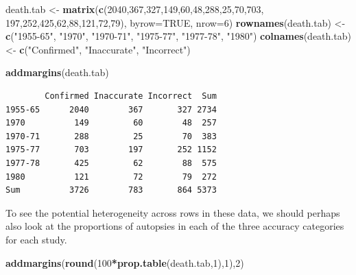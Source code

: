 \documentclass[
]{book}
\newenvironment{Shaded}{\begin{snugshade}}{\end{snugshade}}
\newcommand{\DataTypeTok}[1]{\textcolor[rgb]{0.13,0.29,0.53}{#1}}
\newcommand{\DecValTok}[1]{\textcolor[rgb]{0.00,0.00,0.81}{#1}}
\newcommand{\KeywordTok}[1]{\textcolor[rgb]{0.13,0.29,0.53}{\textbf{#1}}}
\newcommand{\NormalTok}[1]{#1}
\newcommand{\OperatorTok}[1]{\textcolor[rgb]{0.81,0.36,0.00}{\textbf{#1}}}
\newcommand{\OtherTok}[1]{\textcolor[rgb]{0.56,0.35,0.01}{#1}}
\newcommand{\StringTok}[1]{\textcolor[rgb]{0.31,0.60,0.02}{#1}}
\begin{document}
\begin{Shaded}
\begin{Highlighting}[]
\NormalTok{death.tab <-}\StringTok{ }\KeywordTok{matrix}\NormalTok{(}\KeywordTok{c}\NormalTok{(}\DecValTok{2040}\NormalTok{,}\DecValTok{367}\NormalTok{,}\DecValTok{327}\NormalTok{,}\DecValTok{149}\NormalTok{,}\DecValTok{60}\NormalTok{,}\DecValTok{48}\NormalTok{,}\DecValTok{288}\NormalTok{,}\DecValTok{25}\NormalTok{,}\DecValTok{70}\NormalTok{,}\DecValTok{703}\NormalTok{,}
                      \DecValTok{197}\NormalTok{,}\DecValTok{252}\NormalTok{,}\DecValTok{425}\NormalTok{,}\DecValTok{62}\NormalTok{,}\DecValTok{88}\NormalTok{,}\DecValTok{121}\NormalTok{,}\DecValTok{72}\NormalTok{,}\DecValTok{79}\NormalTok{), }\DataTypeTok{byrow=}\OtherTok{TRUE}\NormalTok{, }\DataTypeTok{nrow=}\DecValTok{6}\NormalTok{)}
\KeywordTok{rownames}\NormalTok{(death.tab) <-}\StringTok{ }\KeywordTok{c}\NormalTok{(}\StringTok{"1955-65"}\NormalTok{, }\StringTok{"1970"}\NormalTok{, }\StringTok{"1970-71"}\NormalTok{, }\StringTok{"1975-77"}\NormalTok{, }\StringTok{"1977-78"}\NormalTok{,}
                 \StringTok{"1980"}\NormalTok{)}
\KeywordTok{colnames}\NormalTok{(death.tab) <-}\StringTok{ }\KeywordTok{c}\NormalTok{(}\StringTok{"Confirmed"}\NormalTok{, }\StringTok{"Inaccurate"}\NormalTok{, }\StringTok{"Incorrect"}\NormalTok{)}
 
\KeywordTok{addmargins}\NormalTok{(death.tab)}
\end{Highlighting}
\end{Shaded}

\begin{verbatim}
        Confirmed Inaccurate Incorrect  Sum
1955-65      2040        367       327 2734
1970          149         60        48  257
1970-71       288         25        70  383
1975-77       703        197       252 1152
1977-78       425         62        88  575
1980          121         72        79  272
Sum          3726        783       864 5373
\end{verbatim}

To see the potential heterogeneity across rows in these data, we should perhaps also look at the proportions of autopsies in each of the three accuracy categories for each study.

\begin{Shaded}
\begin{Highlighting}[]
\KeywordTok{addmargins}\NormalTok{(}\KeywordTok{round}\NormalTok{(}\DecValTok{100}\OperatorTok{*}\KeywordTok{prop.table}\NormalTok{(death.tab,}\DecValTok{1}\NormalTok{),}\DecValTok{1}\NormalTok{),}\DecValTok{2}\NormalTok{) }
\end{Highlighting}
\end{Shaded}
\end{document}
